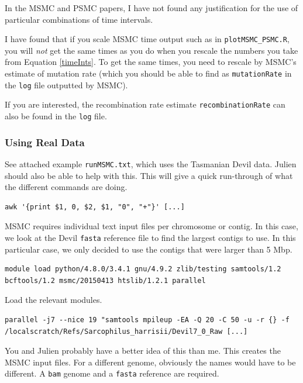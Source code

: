 \documentclass[11pt,a4paper]{article}
\begin{document}
In the MSMC and PSMC papers, I have not found any justification for the use of particular combinations of time intervals.

I have found that if you scale MSMC time output such as in \texttt{plotMSMC\_PSMC.R}, you will \emph{not} get the same times as you do when you rescale the numbers you take from Equation \ref{timeInts}. To get the same times, you need to rescale by MSMC's estimate of mutation rate (which you should be able to find as \texttt{mutationRate} in the \texttt{log} file outputted by MSMC).

If you are interested, the recombination rate estimate \texttt{recombinationRate} can also be found in the \texttt{log} file.

\subsubsection{Using Real Data}
See attached example \texttt{runMSMC.txt}, which uses the Tasmanian Devil data. Julien should also be able to help with this. This will give a quick run-through of what the different commands are doing.

\begin{lstlisting}
awk '{print $1, 0, $2, $1, "0", "+"}' [...]
\end{lstlisting}
MSMC requires individual text input files per chromosome or contig. In this case, we look at the Devil \texttt{fasta} reference file to find the largest contigs to use. In this particular case, we only decided to use the contigs that were larger than 5 Mbp.

\begin{lstlisting}
module load python/4.8.0/3.4.1 gnu/4.9.2 zlib/testing samtools/1.2 bcftools/1.2 msmc/20150413 htslib/1.2.1 parallel
\end{lstlisting}
Load the relevant modules.

\begin{lstlisting}
parallel -j7 --nice 19 "samtools mpileup -EA -Q 20 -C 50 -u -r {} -f /localscratch/Refs/Sarcophilus_harrisii/Devil7_0_Raw [...]
\end{lstlisting}
You and Julien probably have a better idea of this than me. This creates the MSMC input files. For a different genome, obviously the names would have to be different. A \texttt{bam} genome and a \texttt{fasta} reference are required.
\end{document}
